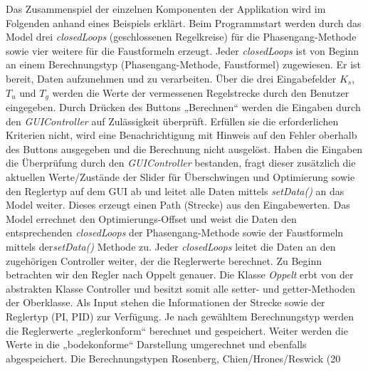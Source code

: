 Das Zusammenspiel der einzelnen Komponenten der Applikation wird im Folgenden anhand eines Beispiels erkl\"art.
Beim Programmstart werden durch das Model drei \textit{closedLoops}
(geschlossenen Regelkreise) f\"ur die Phasengang-Methode sowie vier weitere f\"ur die Faustformeln erzeugt. Jeder \textit{closedLoops} ist von Beginn an einem Berechnungstyp (Phasengang-Methode, Faustformel) zugewiesen. Er ist bereit, Daten aufzunehmen und zu verarbeiten.
\"Uber die drei Eingabefelder $K_s$, $T_u$ und $T_g$ werden die Werte der vermessenen Regelstrecke durch den Benutzer eingegeben. Durch Dr\"ucken des Buttons „Berechnen“ werden die Eingaben durch den \textit{GUIController} auf Zul\"assigkeit \"uberpr\"uft. Erf\"ullen sie die erforderlichen Kriterien nicht, wird eine Benachrichtigung mit Hinweis auf den Fehler oberhalb des Buttons ausgegeben und die Berechnung nicht ausgel\"ost.
Haben die Eingaben die \"Uberpr\"ufung durch den \textit{GUIController} bestanden, fragt dieser zus\"atzlich die aktuellen Werte/Zust\"ande der Slider f\"ur \"Uberschwingen und Optimierung sowie den Reglertyp auf dem GUI ab und leitet alle Daten mittels \textit{setData()} an das Model weiter. Dieses erzeugt einen Path (Strecke) aus den Eingabewerten. Das Model errechnet den Optimierungs-Offset und weist die Daten den entsprechenden \textit{closedLoops} der Phasengang-Methode sowie der Faustformeln mittels der\textit{setData()}  Methode zu. Jeder \textit{closedLoops} leitet die Daten an den zugeh\"origen Controller weiter, der die Reglerwerte berechnet. Zu Beginn betrachten wir den Regler nach Oppelt genauer.
Die Klasse \textit{Oppelt}  erbt von der abstrakten Klasse Controller und besitzt somit alle setter- und getter-Methoden der Oberklasse. Als Input stehen die Informationen der Strecke sowie der Reglertyp (PI, PID) zur Verf\"ugung. Je nach gew\"ahltem Berechnungstyp werden die Reglerwerte „reglerkonform“ berechnet und gespeichert. Weiter werden die Werte in die „bodekonforme“ Darstellung umgerechnet und ebenfalls abgespeichert.
Die Berechnungstypen Rosenberg, Chien/Hrones/Reswick (20%
